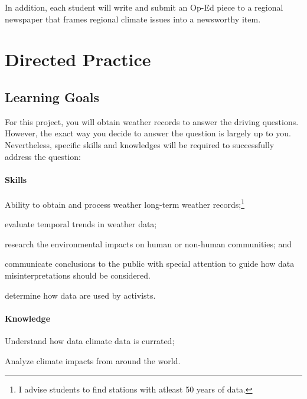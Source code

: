 \documentclass{article}\usepackage[]{graphicx}\usepackage[]{color}
\newenvironment{itemize*}%
  {\begin{itemize}%
    \setlength{\itemsep}{0pt}%
    \setlength{\parskip}{0pt}}%
  {\end{itemize}}
\begin{document}
In addition, each student will write and submit an Op-Ed piece to a regional newspaper that frames regional climate issues into a newsworthy item.


\section{Directed Practice}

\subsection{Learning Goals}

For this project, you will obtain weather records to answer the driving questions. However, the exact way you decide to answer the question is largely up to you. Nevertheless, specific skills and knowledges will be required to successfully address the question:  

\paragraph{Skills}

\begin{itemize*}
  \item Ability to obtain and process weather long-term weather records;\footnote{I advise students to find stations with atleast 50 years of data.}
  \item evaluate temporal trends in weather data;
  \item research the environmental impacts on human or non-human communities; and
  \item communicate conclusions to the public with special attention to guide how data misinterpretations should be considered.
  \item determine how data are used by activists.
\end{itemize*}

\paragraph{Knowledge}
\begin{itemize*}
  \item Understand how data climate data is currated;
  \item Analyze climate impacts from around the world.
\end{itemize*}
\end{document}
